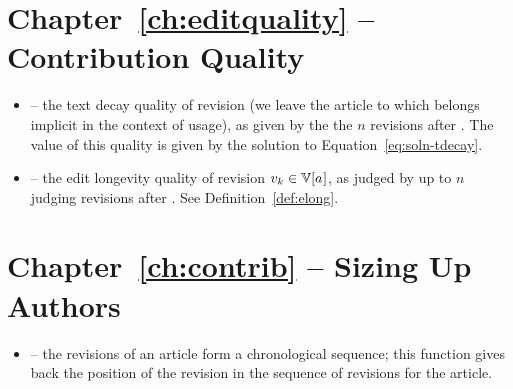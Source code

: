 \section{Chapter~\ref{ch:editquality} -- Contribution Quality}

\begin{itemize}

\item {} -- the text decay quality of revision
     (we leave the article to which  belongs
    implicit in the context of usage), as given by the the $n$ revisions
    after .
    The value of this quality is given by the solution to
    Equation~\ref{eq:soln-tdecay}.

\item {} -- the edit longevity quality of
    revision $\version{k} \in \versions{\article{}}$, as judged by up to
    $n$ judging revisions after .
    See Definition~\ref{def:elong}.

\end{itemize}

\section{Chapter~\ref{ch:contrib} -- Sizing Up Authors}

\begin{itemize}

\item {} -- the revisions of an article form a
    chronological sequence; this function gives back the position
    of the revision in the sequence of revisions for the article.

\end{itemize}

\renewcommand{\labelitemi}{$\bullet$}




